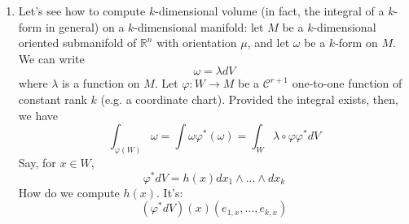 \documentclass{article}
\newcommand{\reals}[0]{\mathbb{R}}
\newcommand{\mc}[1]{\mathcal{#1}}
\begin{document}
\begin{enumerate}
  \item Let's see how to compute \(k\)-dimensional volume (in fact, the integral of a \(k\)-form in general) on a \(k\)-dimensional manifold: let \(M\) be a \(k\)-dimensional oriented submanifold of \(\reals^n\) with orientation \(\mu\), and let \(\omega\) be a \(k\)-form on \(M\). We can write
  \begin{equation}
    \omega = \lambda dV
  \end{equation}
  where \(\lambda\) is a function on \(M\). Let \(\varphi: W \to M\) be a \(\mc{C}^{r + 1}\) one-to-one function of constant rank \(k\) (e.g. a coordinate chart). Provided the integral exists, then, we have
  \begin{equation}
    \int_{\varphi(W)}\omega = \int\omega\varphi^*(\omega) = \int_W\lambda \circ \varphi\varphi^*dV
  \end{equation}
  Say, for \(x \in W\),
  \begin{equation}
    \varphi^*dV = h(x)dx_1 \wedge ... \wedge dx_k
  \end{equation}
  How do we compute \(h(x)\). It's:
  \begin{equation}
    (\varphi^*dV)(x)(e_{1,x},...,e_{k,x})
  \end{equation}

\end{enumerate}
\end{document}
